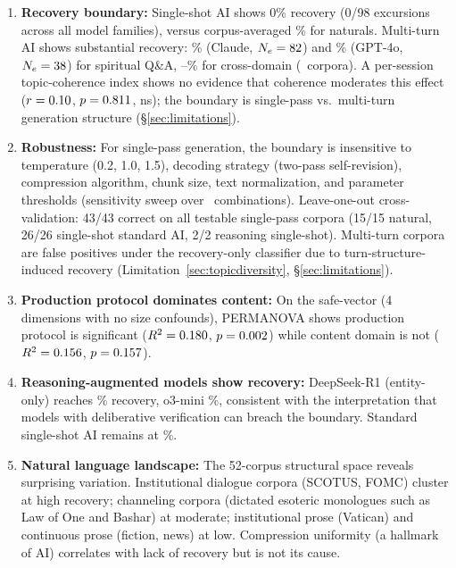 \documentclass[final]{clv2025}
\begin{document}
\begin{enumerate}
\item \textbf{Recovery boundary:} Single-shot AI shows 0\% recovery (0/98 excursions across all model families), versus corpus-averaged \recNatCorpusAvg\% for naturals. Multi-turn AI shows substantial recovery: \recClaudeMT\% (Claude, $N_e = 82$) and \recGPTMT\% (GPT-4o, $N_e = 38$) for spiritual Q\&A, \recMTXdomMin--\recMTXdomMax\% for cross-domain (\nMTXdom\ corpora). A per-session topic-coherence index shows no evidence that coherence moderates this effect ($r = 0.10$, $p = 0.811$, ns); the boundary is single-pass vs.\ multi-turn generation structure (\S\ref{sec:limitations}).

\item \textbf{Robustness:} For single-pass generation, the boundary is insensitive to temperature (0.2, 1.0, 1.5), decoding strategy (two-pass self-revision), compression algorithm, chunk size, text normalization, and parameter thresholds (sensitivity sweep over \nSensitivityCombos\ combinations). Leave-one-out cross-validation: 43/43 correct on all testable single-pass corpora (15/15 natural, 26/26 single-shot standard AI, 2/2 reasoning single-shot). Multi-turn corpora are false positives under the recovery-only classifier due to turn-structure-induced recovery (Limitation~\ref{sec:topicdiversity}, \S\ref{sec:limitations}).

\item \textbf{Production protocol dominates content:} On the safe-vector (4 dimensions with no size confounds), PERMANOVA shows production protocol is significant ($R^2 = 0.180$, $p = 0.002$) while content domain is not ($R^2 = 0.156$, $p = 0.157$).

\item \textbf{Reasoning-augmented models show recovery:} DeepSeek-R1 (entity-only) reaches \recReasoningDS\% recovery, o3-mini \recReasoningOiii\%, consistent with the interpretation that models with deliberative verification can breach the boundary. Standard single-shot AI remains at \recAISingleShot\%.

\item \textbf{Natural language landscape:} The 52-corpus structural space reveals surprising variation. Institutional dialogue corpora (SCOTUS, FOMC) cluster at high recovery; channeling corpora (dictated esoteric monologues such as Law of One and Bashar) at moderate; institutional prose (Vatican) and continuous prose (fiction, news) at low. Compression uniformity (a hallmark of AI) correlates with lack of recovery but is not its cause.
\end{enumerate}
\end{document}
